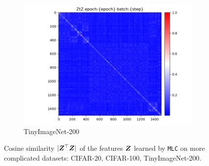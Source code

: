 \documentclass[10pt,twocolumn,letterpaper]{article}
\newcommand{\ours}{MLC}
\newcommand{\mours}{\texttt{\ours}}
\begin{document}
\begin{figure}
\begin{subfigure}{0.33\textwidth}
      \includegraphics[width=\linewidth,trim={1cm 0 1cm 0.8cm},clip]{figures/experiments/larger_dataset/Tiny_ImageNet_Heatmap.png}
      \caption{TinyImageNet-200}
      \label{fig:Tiny_ImageNet-heat}
    \end{subfigure}
    \caption{Cosine similarity $|{\bm{Z}}^\top {\bm{Z}}|$ of the features ${\bm{Z}}$ learned by \mours{} on more complicated datasets: CIFAR-20, CIFAR-100, TinyImageNet-200.}
    \label{fig:more_heatmap}
  \end{figure}
   
   
   
\end{document}
